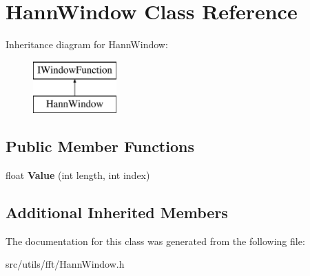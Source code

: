 \hypertarget{class_hann_window}{}\section{Hann\+Window Class Reference}
\label{class_hann_window}
Inheritance diagram for Hann\+Window\+:\begin{figure}[H]
\begin{center}
\leavevmode
\includegraphics[height=2.000000cm]{class_hann_window}
\end{center}
\end{figure}
\subsection*{Public Member Functions}
\begin{DoxyCompactItemize}
\item 
\mbox{\label{class_hann_window_a884c9f3869cad5d2f188877891d73643}} 
float {\bfseries Value} (int length, int index)
\end{DoxyCompactItemize}
\subsection*{Additional Inherited Members}


The documentation for this class was generated from the following file\+:\begin{DoxyCompactItemize}
\item 
src/utils/fft/Hann\+Window.\+h\end{DoxyCompactItemize}
